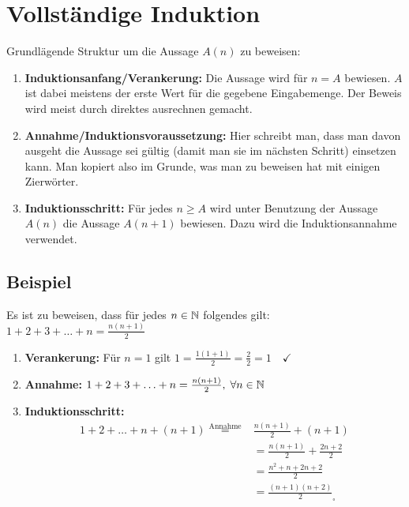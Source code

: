\section{Vollständige Induktion}
Grundlägende Struktur um die Aussage $A(n)$ zu beweisen:
\begin{enumerate}
	\item \textbf{Induktionsanfang/Verankerung:} Die Aussage wird für $n = A$ bewiesen.
	$A$ ist dabei meistens der erste Wert für die gegebene Eingabemenge.
	Der Beweis wird meist durch direktes ausrechnen gemacht.
	\item \textbf{Annahme/Induktionsvoraussetzung:} Hier schreibt man,
	dass man davon ausgeht die Aussage sei gültig (damit man sie im nächsten Schritt)
	einsetzen kann. Man kopiert also im Grunde, was man zu beweisen hat mit einigen Zierwörter.
	\item \textbf{Induktionsschritt:} Für jedes $n \geq A$ wird unter Benutzung der Aussage $A(n)$
	die Aussage $A(n+1)$ bewiesen. Dazu wird die Induktionsannahme verwendet.
\end{enumerate}

\subsection{Beispiel}
Es ist zu beweisen, dass für jedes $n \in \mathbb{N}$ folgendes gilt: $1 + 2 + 3 + \ldots + n = \frac{n(n + 1)}{2}$
\begin{enumerate}
	\item \textbf{Verankerung:} Für $n = 1$ gilt $1 = \frac{1 (1 + 1)}{2} = \frac{2}{2} = 1 \quad \checkmark$ 
	\item \textbf{Annahme:} $1 + 2 + 3 + \ldots + n = \frac{n(n+1)}{2}, \; \forall n \in \mathbb{N}$
	\item \textbf{Induktionsschritt:}
	\begin{align*}
	1 + 2 + \ldots + n + (n+1) \overset{\text{Annahme}}{=} & \frac{n(n+1)}{2} + (n + 1)\\
	&= \frac{n(n+1)}{2} + \frac{2n + 2}{2} \\
	&= \frac{n^2 + n + 2n + 2}{2} \\
	&= \frac{(n + 1)(n + 2)}{2} _\square
	\end{align*}
\end{enumerate}